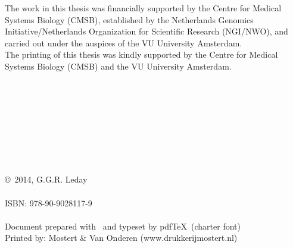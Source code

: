 
\begin{declaration}



\thispagestyle{empty}
\noindent The work in this thesis was financially supported by the Centre for Medical Systems Biology (CMSB),
established by the Netherlands Genomics Initiative/Netherlands Organization for Scientific Research (NGI/NWO),
and carried out under the auspices of the VU University Amsterdam.\\

\noindent The printing of this thesis was kindly supported by the Centre for Medical Systems Biology (CMSB) and the VU University Amsterdam.\\
\\
\\
\\
\\
\\
\\
\\
\\
\vfill
\vfill
\vfill
\vfill

\noindent
{\selectfont \copyright}~2014, G.G.R. Leday\\
\\
\noindent
ISBN: 978-90-9028117-9\\
\vspace{0.2cm}\\
\noindent
Document prepared with {\selectfont \LaTeXe\ }and typeset by pdf{\selectfont \TeX\ }(charter font)\\ 
Printed by: Mostert \& Van Onderen (www.drukkerijmostert.nl)

\end{declaration}

